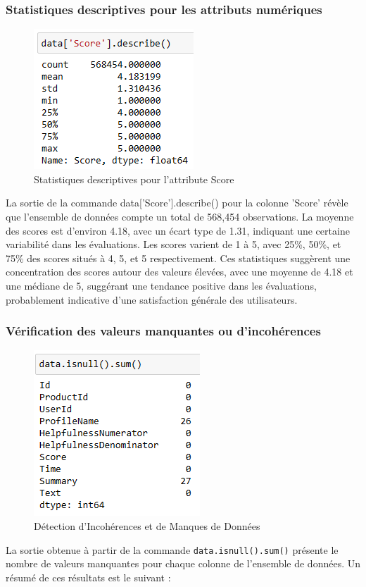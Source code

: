 \subsubsection{Statistiques descriptives pour les attributs numériques}
\begin{figure}[h]
    \centering
    \includegraphics[scale=0.8]{assets/describe.PNG}
    \caption{Statistiques descriptives pour l'attribute Score}
    \label{fig:describe}
\end{figure}
La sortie de la commande data['Score'].describe() pour la colonne 'Score' révèle que l'ensemble de données compte un total de 568,454 observations. La moyenne des scores est d'environ 4.18, avec un écart type de 1.31, indiquant une certaine variabilité dans les évaluations. Les scores varient de 1 à 5, avec 25\%, 50\%, et 75\% des scores situés à 4, 5, et 5 respectivement. Ces statistiques suggèrent une concentration des scores autour des valeurs élevées, avec une moyenne de 4.18 et une médiane de 5, suggérant une tendance positive dans les évaluations, probablement indicative d'une satisfaction générale des utilisateurs.
 \newpage
\subsubsection{Vérification des valeurs manquantes ou d'incohérences}
\begin{figure}[h]
    \centering
    \includegraphics[scale=0.7]{assets/isnull.PNG}
    \caption{Détection d'Incohérences et de Manques de Données}
    \label{fig:isnull}
\end{figure}
La sortie obtenue à partir de la commande \texttt{data.isnull().sum()} présente le nombre de valeurs manquantes pour chaque colonne de l'ensemble de données. Un résumé de ces résultats est le suivant :

